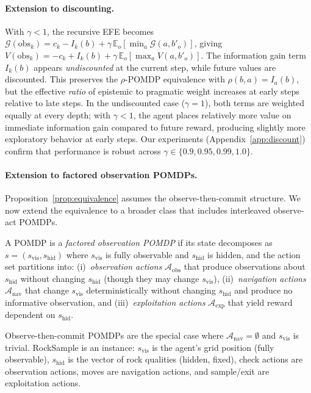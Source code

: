 \documentclass[runningheads]{llncs}
\begin{document}
\paragraph{Extension to discounting.} With $\gamma < 1$, the recursive EFE becomes $\mathcal{G}(\text{obs}_k) = c_k - I_k(b) + \gamma\, \mathbb{E}_o[\min_a \mathcal{G}(a, b'_o)]$, giving $V(\text{obs}_k) = -c_k + I_k(b) + \gamma\, \mathbb{E}_o[\max_a V(a, b'_o)]$. The information gain term $I_k(b)$ appears \emph{undiscounted} at the current step, while future values are discounted. This preserves the $\rho$-POMDP equivalence with $\rho(b,a) = I_a(b)$, but the effective \emph{ratio} of epistemic to pragmatic weight increases at early steps relative to late steps. In the undiscounted case ($\gamma{=}1$), both terms are weighted equally at every depth; with $\gamma < 1$, the agent places relatively more value on immediate information gain compared to future reward, producing slightly more exploratory behavior at early steps. Our experiments (Appendix~\ref{app:discount}) confirm that performance is robust across $\gamma \in \{0.9, 0.95, 0.99, 1.0\}$.

\paragraph{Extension to factored observation POMDPs.}
\label{par:frontier}
Proposition~\ref{prop:equivalence} assumes the observe-then-commit structure. We now extend the equivalence to a broader class that includes interleaved observe-act POMDPs.

\begin{definition}
\label{def:factored}
A POMDP is a \emph{factored observation POMDP} if its state decomposes as $s = (s_{\mathrm{vis}}, s_{\mathrm{hid}})$ where $s_{\mathrm{vis}}$ is fully observable and $s_{\mathrm{hid}}$ is hidden, and the action set partitions into: (i)~\emph{observation actions} $\mathcal{A}_{\mathrm{obs}}$ that produce observations about $s_{\mathrm{hid}}$ without changing $s_{\mathrm{hid}}$ (though they may change $s_{\mathrm{vis}}$), (ii)~\emph{navigation actions} $\mathcal{A}_{\mathrm{nav}}$ that change $s_{\mathrm{vis}}$ deterministically without changing $s_{\mathrm{hid}}$ and produce no informative observation, and (iii)~\emph{exploitation actions} $\mathcal{A}_{\mathrm{exp}}$ that yield reward dependent on $s_{\mathrm{hid}}$.
\end{definition}

Observe-then-commit POMDPs are the special case where $\mathcal{A}_{\mathrm{nav}} = \emptyset$ and $s_{\mathrm{vis}}$ is trivial. RockSample \citep{smith2004} is an instance: $s_{\mathrm{vis}}$ is the agent's grid position (fully observable), $s_{\mathrm{hid}}$ is the vector of rock qualities (hidden, fixed), check actions are observation actions, moves are navigation actions, and sample/exit are exploitation actions.
\end{document}
